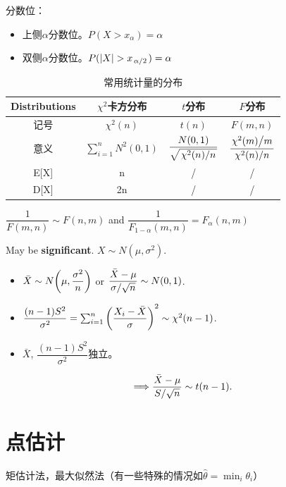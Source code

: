\documentclass{article}
\begin{document}
\begin{defi}
    分数位：
	\begin{itemize}
		\item 上侧$\alpha$分数位。$P(X>x_\alpha)=\alpha$
		\item 双侧$\alpha$分数位。$P(\abs{X}>x_{\flatfrac{\alpha}{2}})=\alpha$
	\end{itemize}
\end{defi}

\begin{table}[H]
	\centering
	\begin{tabular}{|c|ccc|}
		\hline
		Distributions & $\chi^2$卡方分布 & $t$分布 & $F$分布
		\\[4pt]\hline
		记号 & $\chi^2(n)$ & $t(n)$ & $F(m,n)$
		\\[4pt]
		意义 & 
		$\sum_{i=1}^nN^2(0,1)$ & 
		$\dfrac{N(0,1)}{\sqrt{\flatfrac{\chi^2(n)}{n}}}$ & 
		$\dfrac{\flatfrac{\chi^2(m)}{m}}{\flatfrac{\chi^2(n)}{n}}$
		\\[9pt]
		E[X] & n & / & /
		\\[4pt]
		D[X] & 2n & / & /
		\\[4pt]\hline
	\end{tabular}
	\caption{常用统计量的分布}
\end{table}

\begin{prt}[F分布]
	$\dfrac{1}{F(m,n)}\sim F(n,m)$ and $\dfrac{1}{F_{1-\alpha}(m,n)}=F_\alpha(n,m)$
\end{prt}

\begin{thm}
	May be \textbf{significant}. $X\sim N(\mu,\sigma^2)$.
	\begin{itemize}
		\item 
			$\bar{X}\sim N\qty(\mu,\dfrac{\sigma^2}{n})$ 
			or 
			$\dfrac{\bar{X}-\mu}{\flatfrac{\sigma}{\sqrt{n}}}\sim N(0,1)$.
		\item 
			$\dfrac{(n-1)S^2}{\sigma^2}=\sum_{i=1}^n\qty(\dfrac{X_i-\bar{X}}{\sigma})^2\sim\chi^2(n-1)$.
		\item $\bar{X}$, $\dfrac{(n-1)S^2}{\sigma^2}$独立。
	\end{itemize}
	\[\Longrightarrow \dfrac{\bar{X}-\mu}{\flatfrac{S}{\sqrt{n}}}\sim t(n-1).\]
\end{thm}

\section{点估计}
\begin{defi}
	矩估计法，最大似然法（有一些特殊的情况如$\hat{\theta}=\min_i\theta_i$）
\end{defi}
\end{document}
